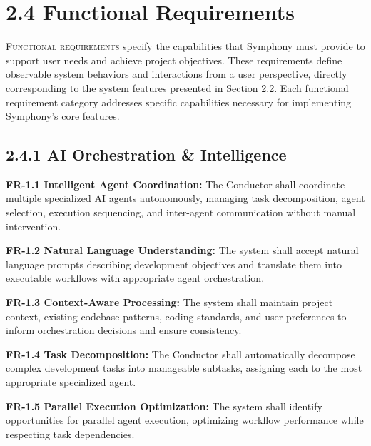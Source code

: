 \clearpage
\section{2.4 Functional Requirements}
\label{sec:functional-requirements}

\lettrine{F}{unctional requirements} specify the capabilities that Symphony must provide to support user needs and achieve project objectives. These requirements define observable system behaviors and interactions from a user perspective, directly corresponding to the system features presented in Section 2.2. Each functional requirement category addresses specific capabilities necessary for implementing Symphony's core features.

\subsection*{2.4.1 AI Orchestration \& Intelligence}
\label{sec:fr-ai-orchestration}

\textbf{FR-1.1 Intelligent Agent Coordination:}
The Conductor shall coordinate multiple specialized AI agents autonomously, managing task decomposition, agent selection, execution sequencing, and inter-agent communication without manual intervention.

\textbf{FR-1.2 Natural Language Understanding:}
The system shall accept natural language prompts describing development objectives and translate them into executable workflows with appropriate agent orchestration.

\textbf{FR-1.3 Context-Aware Processing:}
The system shall maintain project context, existing codebase patterns, coding standards, and user preferences to inform orchestration decisions and ensure consistency.

\textbf{FR-1.4 Task Decomposition:}
The Conductor shall automatically decompose complex development tasks into manageable subtasks, assigning each to the most appropriate specialized agent.

\textbf{FR-1.5 Parallel Execution Optimization:}
The system shall identify opportunities for parallel agent execution, optimizing workflow performance while respecting task dependencies.

